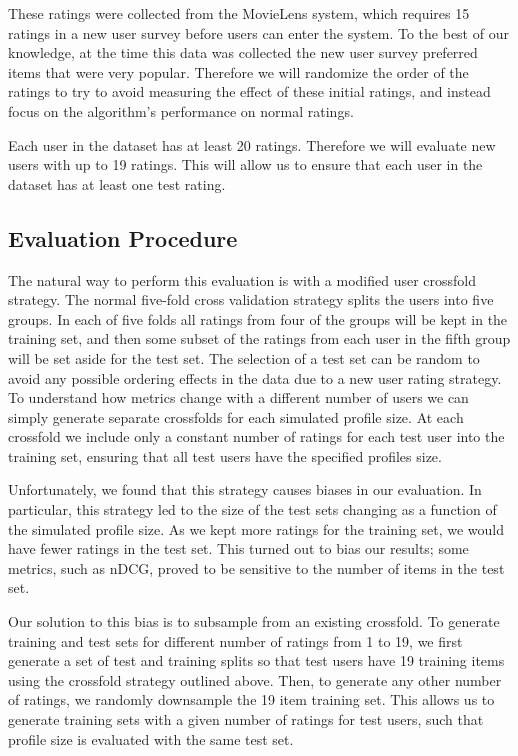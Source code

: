 \documentclass[letterpaper]{sig-alternate}
\begin{document}
  These ratings were collected from the MovieLens system, which requires 15 ratings in a new user survey before users can enter the system.
  To the best of our knowledge, at the time this data was collected the new user survey preferred items that were very popular.
  Therefore we will randomize the order of the ratings to try to avoid measuring the effect of these initial ratings, and instead focus on the algorithm's performance on normal ratings.
  
  Each user in the dataset has at least 20 ratings.
  Therefore we will evaluate new users with up to 19 ratings.
  This will allow us to ensure that each user in the dataset has at least one test rating.

  
  \subsection*{Evaluation Procedure}

  The natural way to perform this evaluation is with a modified user crossfold strategy.
  The normal five-fold cross validation strategy splits the users into five groups.
  In each of five folds all ratings from four of the groups will be kept in the training set, and then some subset of the ratings from each user in the fifth group will be set aside for the test set.
  The selection of a test set can be random to avoid any possible ordering effects in the data due to a new user rating strategy.
  To understand how metrics change with a different number of users we can simply generate separate crossfolds for each simulated profile size.
  At each crossfold we include only a constant number of ratings for each test user into the training set, ensuring that all test users have the specified profiles size.
  
  Unfortunately, we found that this strategy causes biases in our evaluation.
  In particular, this strategy led to the size of the test sets changing as a function of the simulated profile size.
  As we kept more ratings for the training set, we would have fewer ratings in the test set.
  This turned out to bias our results; some metrics, such as nDCG, proved to be sensitive to the number of items in the test set.
  
  Our solution to this bias is to subsample from an existing crossfold.
  To generate training and test sets for different number of ratings from 1 to 19, we first generate a set of test and training splits so that test users have 19 training items using the crossfold strategy outlined above.
  Then, to generate any other number of ratings, we randomly downsample the 19 item training set.
  This allows us to generate training sets with a given number of ratings for test users, such that profile size is evaluated with the same test set.
\end{document}
